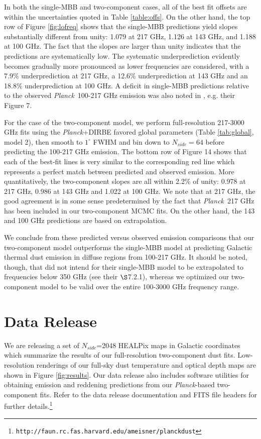 \documentclass{emulateapj}
\newcommand{\PLANCK}{{\it Planck}}
\begin{document}
In both the single-MBB and two-component cases, all of the best fit offsets are
within the uncertainties quoted in Table \ref{table:offs}. On the other hand, 
the top row of Figure \ref{fig:lofreq} shows that the \cite{planckdust} 
single-MBB predictions yield slopes substantially different from unity: 1.079 
at 217 GHz, 1.126 at 143 GHz, and 1.188 at 100 GHz. The fact that the slopes 
are larger than unity indicates that the \cite{planckdust} predictions are 
systematically low. The systematic underprediction evidently becomes gradually 
more pronounced as lower frequencies are considered, with a 7.9\% 
underprediction at 217 GHz, a 12.6\% underprediction at 143 GHz and an 18.8\% 
underprediction at 100 GHz. A deficit in single-MBB predictions relative to
the observed \PLANCK~100-217 GHz emission was also noted in 
\cite{planckdust2011}, e.g. their Figure 7.

For the case of the two-component model, we perform full-resolution 217-3000 
GHz fits using the \PLANCK+DIRBE favored global parameters (Table 
\ref{tab:global}, model 2), then smooth to $1^{\circ}$ FWHM and bin down to 
$N_{side}=64$ before predicting the 100-217 GHz emission. The bottom row of
Figure 14 shows that each of the best-fit lines is very similar to the 
corresponding red line which represents a perfect match between predicted and 
observed emission. More quantitatively, the two-component slopes are all within
2.2\% of unity: 0.978 at 217 GHz, 0.986 at 143 GHz and 1.022 at 100 GHz. We 
note that at 217 GHz, the good agreement is in some sense predetermined by the 
fact that \PLANCK~217 GHz has been included in our two-component MCMC fits. On 
the other hand, the 143 and 100 GHz predictions are based on extrapolation.

We conclude from these predicted versus observed emission comparisons that our 
two-component model outperforms the \cite{planckdust} single-MBB model at 
predicting Galactic thermal dust emission in diffuse regions from 100-217 GHz.
It should be noted, though, that \cite{planckdust} did not intend for their 
single-MBB model to be extrapolated to frequencies below 350 GHz (see their
$\S$7.2.1), whereas we optimized our two-component model to be valid over the 
entire 100-3000 GHz frequency range.

\section{Data Release}
\label{sec:release}
We are releasing a set of $N_{side}$=2048 HEALPix maps in Galactic coordinates 
which summarize the results of our full-resolution two-component dust fits. 
Low-resolution renderings of our full-sky dust temperature and optical depth 
maps are shown in Figure \ref{fig:results}. Our data release also includes
software utilities for obtaining emission and reddening predictions from our 
\PLANCK-based two-component fits. Refer to the data release documentation and 
FITS file headers for further details.\footnote{\texttt{http://faun.rc.fas.harvard.edu/ameisner/planckdust}}
\end{document}
